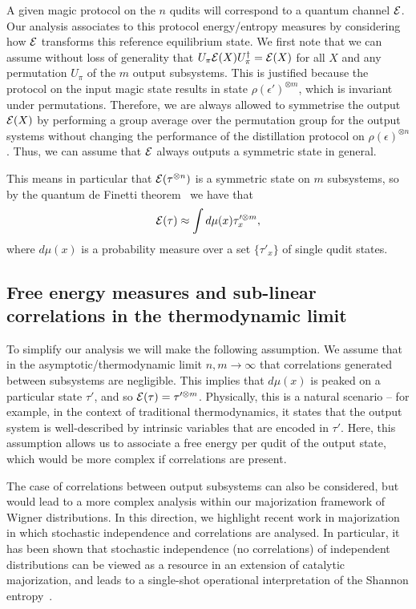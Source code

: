 \documentclass[pra,
aps,
twocolumn,
superscriptaddress,
groupedaddress,
nofootinbib,
reprint
]{revtex4-1}
\begin{document}
A given magic protocol on the $n$ qudits will correspond to a quantum channel ${\mathcal E}$. Our analysis associates to this protocol energy/entropy measures by considering how ${\mathcal E}$ transforms this reference equilibrium state. We first note that we can assume without loss of generality that $U_\pi{\mathcal E}(X) U_\pi^\dagger = {\mathcal E}(X)$ for all $X$ and any permutation $U_\pi$ of the $m$ output subsystems. This is justified because the protocol on the input magic state results in state $\rho(\epsilon')^{\otimes m}$, which is invariant under permutations. Therefore, we are always allowed to symmetrise the output ${\mathcal E}(X)$ by performing a group average over the permutation group for the output systems without changing the performance of the distillation protocol on $\rho(\epsilon)^{\otimes n}$. Thus, we can assume that ${\mathcal E}$ always outputs a symmetric state in general.

This means in particular that ${\mathcal E}(\tau^{\otimes n})$ is a symmetric state on $m$ subsystems, so by the quantum de Finetti theorem~\cite{christandl_2007} we have that
\begin{equation}
{\mathcal E}(\tau) \approx \int d\mu(x) \tau_x^{\prime \otimes m},
\end{equation}
where $d\mu(x)$ is a probability measure over a set $\{\tau'_x\}$ of single qudit states.

\subsection{Free energy measures and sub-linear correlations in the thermodynamic limit}
To simplify our analysis we will make the following assumption. We assume that in the asymptotic/thermodynamic limit $n,m \rightarrow \infty$ that correlations generated between subsystems are negligible. This implies that $d\mu(x)$ is peaked on a particular state $\tau'$, and so ${\mathcal E}(\tau) = \tau^{\prime \otimes m}$. Physically, this is a natural scenario -- for example, in the context of traditional thermodynamics, it states that the output system is well-described by intrinsic variables that are encoded in $\tau'$. Here, this assumption allows us to associate a free energy per qudit of the output state, which would be more complex if correlations are present.

The case of correlations between output subsystems can also be considered, but would lead to a more complex analysis within our majorization framework of Wigner distributions. In this direction, we highlight recent work in majorization in which stochastic independence and correlations are analysed. In particular, it has been shown that stochastic independence (no correlations) of independent distributions can be viewed as a resource in an extension of catalytic majorization, and leads to a single-shot operational interpretation of the Shannon entropy~\cite{muller_2015, muller_2016, muller_2019}.
\end{document}
